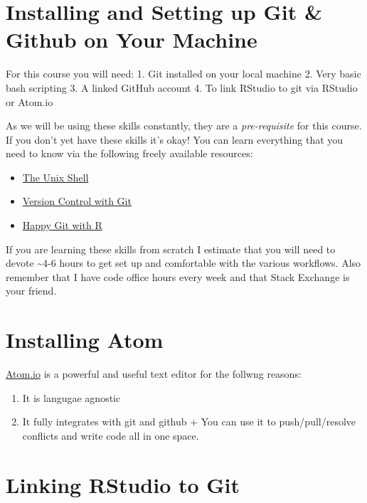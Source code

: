 \documentclass[]{book}
\begin{document}
\hypertarget{installing-and-setting-up-git-github-on-your-machine}{%
\section{Installing and Setting up Git \& Github on Your Machine}\label{installing-and-setting-up-git-github-on-your-machine}}

For this course you will need:
1. Git installed on your local machine
2. Very basic bash scripting
3. A linked GitHub account
4. To link RStudio to git via RStudio or Atom.io

As we will be using these skills constantly, they are a \emph{pre-requisite} for this course. If you don't yet have these skills it's okay! You can learn everything that you need to know via the following freely available resources:

\begin{itemize}
\item
  \href{http://swcarpentry.github.io/shell-novice}{The Unix Shell}
\item
  \href{http://swcarpentry.github.io/git-novice}{Version Control with Git}
\item
  \href{https://happygitwithr.com/}{Happy Git with R}
\end{itemize}

If you are learning these skills from scratch I estimate that you will need to devote \textasciitilde{}4-6 hours to get set up and comfortable with the various workflows. Also remember that I have code office hours every week and that Stack Exchange is your friend.

\hypertarget{installing-atom}{%
\section{Installing Atom}\label{installing-atom}}

\href{https://atom.io/}{Atom.io} is a powerful and useful text editor for the follwng reasons:

\begin{enumerate}
\def\labelenumi{\arabic{enumi}.}
\item
  It is langugae agnostic
\item
  It fully integrates with git and github
  + You can use it to push/pull/resolve conflicts and write code all in one space.
\end{enumerate}

\hypertarget{linking-rstudio-to-git}{%
\section{Linking RStudio to Git}\label{linking-rstudio-to-git}}
\end{document}
